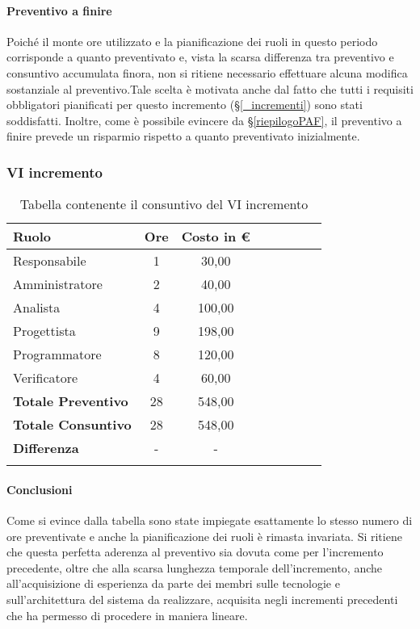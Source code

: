 \paragraph{Preventivo a finire}
Poiché il monte ore utilizzato e la pianificazione dei ruoli in questo periodo corrisponde a quanto preventivato e, vista la scarsa differenza tra preventivo e consuntivo accumulata finora, non si ritiene necessario effettuare alcuna modifica sostanziale al preventivo.Tale scelta è motivata anche dal fatto che tutti i requisiti obbligatori pianificati per questo incremento (\S\ref{_incrementi}) sono stati soddisfatti. Inoltre, come è possibile evincere da \S\ref{riepilogoPAF}, il preventivo a finire prevede un risparmio rispetto a quanto preventivato inizialmente.

\subsubsection{VI incremento}\label{_consuntivoImp3}
\begin{longtable}{|l|c|c|c|c|c|c|c|}
	\hline
	\rowcolor{lighter-grayer}
	\textbf{Ruolo}             & \textbf{Ore} & \textbf{Costo in €} \\
	\hline
	\endfirsthead

	\hline
	Responsabile               & 1           & 30,00              \\
	\hline
	\hline
	Amministratore             & 2       & 40,00      \\
	\hline
	\hline
	Analista                   & 4       & 100,00   \\
	\hline
	\hline
	Progettista                & 9            & 198,00              \\
	\hline
	\hline
	Programmatore              & 8            & 120,00                   \\
	\hline
	\hline
	Verificatore               & 4       & 60,00    \\
	\hline
	\textbf{Totale Preventivo} & 28          & 548,00            \\
	\hline
	\hline
	\textbf{Totale Consuntivo} & 28          & 548,00            \\
	\hline
	\hline
	\textbf{Differenza}        & -           & -           \\
	\hline
	\rowcolor{white}
	\caption{Tabella contenente il consuntivo del VI incremento}
\end{longtable}
\paragraph{Conclusioni}
Come si evince dalla tabella sono state impiegate esattamente lo stesso numero di ore preventivate e anche la pianificazione dei ruoli è rimasta invariata. Si ritiene che questa perfetta aderenza al preventivo sia dovuta come per l'incremento precedente, oltre che alla scarsa lunghezza temporale dell'incremento, anche all'acquisizione di esperienza da parte dei membri sulle tecnologie e sull'architettura del sistema da realizzare, acquisita negli incrementi precedenti che ha permesso di procedere in maniera lineare.

